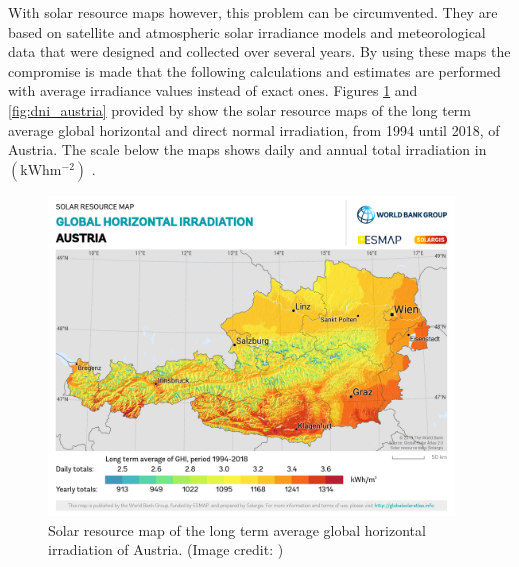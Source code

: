 With solar resource maps however, this problem can be circumvented. They are based on satellite and atmospheric solar irradiance models and meteorological data that were designed and collected over several years. By using these maps the compromise is made that the following calculations and estimates are performed with average irradiance values instead of exact ones. Figures \ref{fig:ghi_austria} and \ref{fig:dni_austria} provided by \cite{SolargisMaps:2020, GlobalSolarAtlas:2020} show the solar resource maps of the long term average global horizontal and direct normal irradiation, from 1994 until 2018, of Austria. The scale below the maps shows daily and annual total irradiation in $\left( \mathrm{kWh}\mathrm{m}^{-2} \right)$ \cite{MeteorologicalModeling:2020, SolarRadiationModeling:2020, SolargisData:2020}. 
\begin{figure}[h!]
	\centering
  	\includegraphics[width = 0.96\textwidth]{solar_maps/austria/austria_ghi}
  	\caption{Solar resource map of the long term average global horizontal irradiation of Austria. (Image credit: \cite{GlobalSolarAtlas:2020, Solargis:2021})}
	\label{fig:ghi_austria}
\end{figure}

